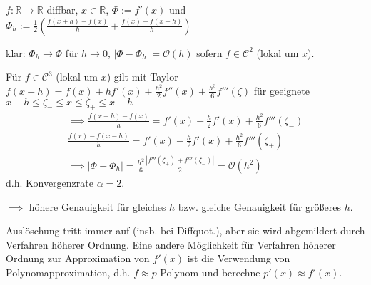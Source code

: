 \begin{example}
	$f:\mathbb{R} \rightarrow \mathbb{R}$ diffbar, $x\in \mathbb{R}$, $\Phi := f'(x)$ und $\Phi_h := \frac{1}{2} \left(\frac{f(x+h)-f(x)}{h} + \frac{f(x)-f(x-h)}{h}\right)$
	
	klar: $\Phi_h \rightarrow \Phi$ für $h \rightarrow 0$, $|\Phi - \Phi_h| = \mathcal{O}(h)$ sofern $f \in \mathcal{C}^2$ (lokal um $x$).
	
	Für $f \in \mathcal{C}^3$ (lokal um $x$) gilt mit Taylor $f(x+h) = f(x) + hf'(x) + \frac{h^2}{2}f''(x) + \frac{h^3}{6}f'''(\zeta)$ für geeignete $x-h \leq \zeta_- \leq x \leq \zeta_+ \leq x+h$
	\begin{align*}
		\implies \frac{f(x+h)-f(x)}{h} = f'(x) + \frac{h}{2} f'(x) + \frac{h^2}{6} f'''(\zeta_-)\\
		\frac{f(x)-f(x-h)}{h} = f'(x) - \frac{h}{2} f'(x) + \frac{h^2}{6} f'''(\zeta_+)\\
		\implies |\Phi - \Phi_h| = \frac{h^2}{6} \frac{|f'''(\zeta_+) + f'''(\zeta_-)|}{2} = \mathcal{O}(h^2)
	\end{align*}
	d.h. Konvergenzrate $\alpha = 2$.
	
	$\implies$ höhere Genauigkeit für gleiches $h$ bzw. gleiche Genauigkeit für größeres $h$.
\end{example}

\begin{remark}
	Auslöschung tritt immer auf (insb. bei Diffquot.), aber sie wird abgemildert durch Verfahren höherer Ordnung. Eine andere Möglichkeit für Verfahren höherer Ordnung zur Approximation von $f'(x)$ ist die Verwendung von Polynomapproximation, d.h. $f \approx p$ Polynom und berechne $p'(x) \approx f'(x)$.
\end{remark}
